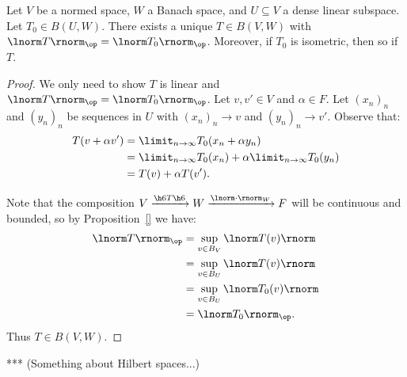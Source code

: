     \begin{corollary}
        Let $V$ be a normed space, $W$ a Banach space, and $U \subseteq V$ a dense linear subspace. Let $T_0 \in B(U,W)$. There exists a unique $T \in B(V,W)$ with $\lnorm T \rnorm_{\op} = \lnorm T_0 \rnorm_{\op}$. Moreover, if $T_0$ is isometric, then so if $T$.
    \end{corollary}
        \begin{proof}
            We only need to show $T$ is linear and $\lnorm T \rnorm_{\op} = \lnorm T_0 \rnorm_{\op}$. Let $v,v' \in V$ and $\alpha \in F$. Let $(x_n)_n$ and $(y_n)_n$ be sequences in $U$ with $(x_n)_n \rightarrow v$ and $(y_n)_n \rightarrow v'$. Observe that:
                \begin{equation*}
                \begin{split}
                    T(v + \alpha v')
                    & = \limit_{n \rightarrow \infty} T_0(x_n + \alpha y_n) \\
                    & = \limit_{n \rightarrow \infty} T_0(x_n) + \alpha \limit_{n \rightarrow \infty} T_0(y_n) \\
                    & = T(v) + \alpha T(v').
                \end{split}
                \end{equation*}
            
            Note that the composition $V \xrightarrow{\h6T\h6} W \xrightarrow{\lnorm \cdot \rnorm_W} F$ will be continuous and bounded, so by Proposition~\ref{} we have:
                \begin{equation*}
                \begin{split}
                   \lnorm T \rnorm_{\op} 
                   & = \sup_{v \in B_V}\lnorm T(v) \rnorm \\
                   & = \sup_{v \in B_U}\lnorm T(v) \rnorm \\
                   & = \sup_{v \in B_U}\lnorm T_0(v) \rnorm \\
                   & = \lnorm T_0 \rnorm_{\op}.
                \end{split}
                \end{equation*}
            Thus $T \in B(V,W)$.
        \end{proof}

    \begin{example}***
        (Something about Hilbert spaces...)
    \end{example}

    \begin{center}
    \end{center}

